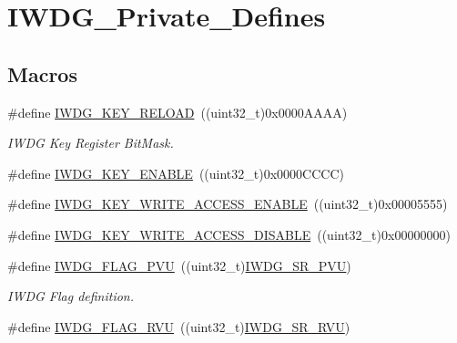 \hypertarget{group___i_w_d_g___private___defines}{\section{I\-W\-D\-G\-\_\-\-Private\-\_\-\-Defines}
\label{group___i_w_d_g___private___defines}
}
\subsection*{Macros}
\begin{DoxyCompactItemize}
\item 
\#define \hyperlink{group___i_w_d_g___private___defines_ga33abf7b7c76dfda6b6380448a1d28966}{I\-W\-D\-G\-\_\-\-K\-E\-Y\-\_\-\-R\-E\-L\-O\-A\-D}~((uint32\-\_\-t)0x0000\-A\-A\-A\-A)
\begin{DoxyCompactList}\small\item\em I\-W\-D\-G Key Register Bit\-Mask. \end{DoxyCompactList}\item 
\#define \hyperlink{group___i_w_d_g___private___defines_ga493295d56bb62752982234755612386f}{I\-W\-D\-G\-\_\-\-K\-E\-Y\-\_\-\-E\-N\-A\-B\-L\-E}~((uint32\-\_\-t)0x0000\-C\-C\-C\-C)
\item 
\#define \hyperlink{group___i_w_d_g___private___defines_ga90fbb0a5e42ed25b44c0330ad75724e6}{I\-W\-D\-G\-\_\-\-K\-E\-Y\-\_\-\-W\-R\-I\-T\-E\-\_\-\-A\-C\-C\-E\-S\-S\-\_\-\-E\-N\-A\-B\-L\-E}~((uint32\-\_\-t)0x00005555)
\item 
\#define \hyperlink{group___i_w_d_g___private___defines_ga9e63bed9af448ad96c4621e74230a415}{I\-W\-D\-G\-\_\-\-K\-E\-Y\-\_\-\-W\-R\-I\-T\-E\-\_\-\-A\-C\-C\-E\-S\-S\-\_\-\-D\-I\-S\-A\-B\-L\-E}~((uint32\-\_\-t)0x00000000)
\item 
\#define \hyperlink{group___i_w_d_g___private___defines_gae20afcf399fad1534e79a8d30ea86c9c}{I\-W\-D\-G\-\_\-\-F\-L\-A\-G\-\_\-\-P\-V\-U}~((uint32\-\_\-t)\hyperlink{group___peripheral___registers___bits___definition_ga269bd5618ba773d32275b93be004c554}{I\-W\-D\-G\-\_\-\-S\-R\-\_\-\-P\-V\-U})
\begin{DoxyCompactList}\small\item\em I\-W\-D\-G Flag definition. \end{DoxyCompactList}\item 
\#define \hyperlink{group___i_w_d_g___private___defines_ga3731bf2711c234ffe5b405fb6634ebca}{I\-W\-D\-G\-\_\-\-F\-L\-A\-G\-\_\-\-R\-V\-U}~((uint32\-\_\-t)\hyperlink{group___peripheral___registers___bits___definition_gadffb8339e556a3b10120b15f0dacc232}{I\-W\-D\-G\-\_\-\-S\-R\-\_\-\-R\-V\-U})
\end{DoxyCompactItemize}


